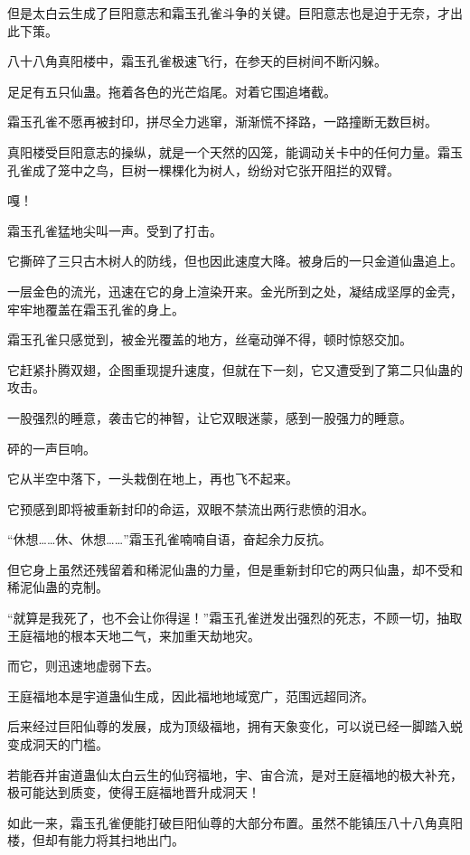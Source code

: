 \begin{this_body}
但是太白云生成了巨阳意志和霜玉孔雀斗争的关键。巨阳意志也是迫于无奈，才出此下策。

八十八角真阳楼中，霜玉孔雀极速飞行，在参天的巨树间不断闪躲。

足足有五只仙蛊。拖着各色的光芒焰尾。对着它围追堵截。

霜玉孔雀不愿再被封印，拼尽全力逃窜，渐渐慌不择路，一路撞断无数巨树。

真阳楼受巨阳意志的操纵，就是一个天然的囚笼，能调动关卡中的任何力量。霜玉孔雀成了笼中之鸟，巨树一棵棵化为树人，纷纷对它张开阻拦的双臂。

嘎！

霜玉孔雀猛地尖叫一声。受到了打击。

它撕碎了三只古木树人的防线，但也因此速度大降。被身后的一只金道仙蛊追上。

一层金色的流光，迅速在它的身上渲染开来。金光所到之处，凝结成坚厚的金壳，牢牢地覆盖在霜玉孔雀的身上。

霜玉孔雀只感觉到，被金光覆盖的地方，丝毫动弹不得，顿时惊怒交加。

它赶紧扑腾双翅，企图重现提升速度，但就在下一刻，它又遭受到了第二只仙蛊的攻击。

一股强烈的睡意，袭击它的神智，让它双眼迷蒙，感到一股强力的睡意。

砰的一声巨响。

它从半空中落下，一头栽倒在地上，再也飞不起来。

它预感到即将被重新封印的命运，双眼不禁流出两行悲愤的泪水。

“休想……休、休想……”霜玉孔雀喃喃自语，奋起余力反抗。

但它身上虽然还残留着和稀泥仙蛊的力量，但是重新封印它的两只仙蛊，却不受和稀泥仙蛊的克制。

“就算是我死了，也不会让你得逞！”霜玉孔雀迸发出强烈的死志，不顾一切，抽取王庭福地的根本天地二气，来加重天劫地灾。

而它，则迅速地虚弱下去。

王庭福地本是宇道蛊仙生成，因此福地地域宽广，范围远超同济。

后来经过巨阳仙尊的发展，成为顶级福地，拥有天象变化，可以说已经一脚踏入蜕变成洞天的门槛。

若能吞并宙道蛊仙太白云生的仙窍福地，宇、宙合流，是对王庭福地的极大补充，极可能达到质变，使得王庭福地晋升成洞天！

如此一来，霜玉孔雀便能打破巨阳仙尊的大部分布置。虽然不能镇压八十八角真阳楼，但却有能力将其扫地出门。


\end{this_body}
